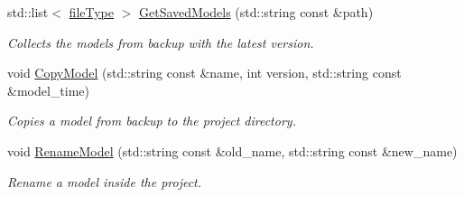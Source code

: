 \begin{DoxyCompactItemize}
std\+::list$<$ \mbox{\hyperlink{structmlm_1_1fileType}{file\+Type}} $>$ \mbox{\hyperlink{namespacemlm_a7e5335d56536117373d3d70d7bee0aca}{Get\+Saved\+Models}} (std\+::string const \&path)
\begin{DoxyCompactList}\small\item\em Collects the models from backup with the latest version. \end{DoxyCompactList}\item 
void \mbox{\hyperlink{namespacemlm_a031e4e0f6aef23eece0cba1c69811212}{Copy\+Model}} (std\+::string const \&name, int version, std\+::string const \&model\+\_\+time)
\begin{DoxyCompactList}\small\item\em Copies a model from backup to the project directory. \end{DoxyCompactList}\item 
void \mbox{\hyperlink{namespacemlm_a93971c6e67082f90b5696972b12dee89}{Rename\+Model}} (std\+::string const \&old\+\_\+name, std\+::string const \&new\+\_\+name)
\begin{DoxyCompactList}\small\item\em Rename a model inside the project. \end{DoxyCompactList}\end{DoxyCompactItemize}
